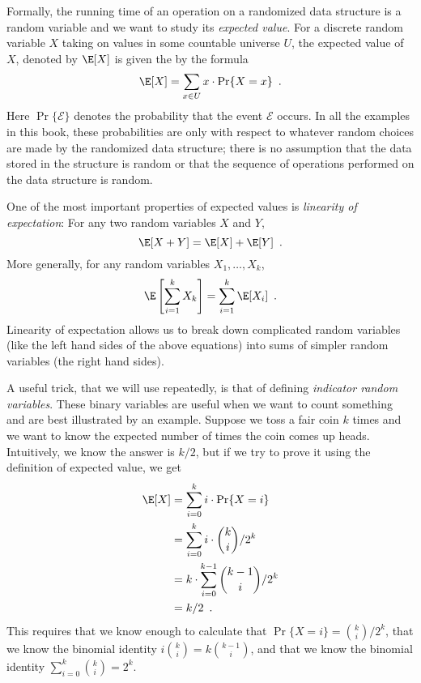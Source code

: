 Formally, the running time of an operation on a randomized data structure
is a random variable and we want to study its \emph{expected value}. For
a discrete random variable $X$ taking on values in some countable universe
$U$, the expected value of $X$, denoted by $\E[X]$ is given the by the formula
\[
    \E[X] = \sum_{x\in U} x\cdot\Pr\{X=x\} \enspace .
\]
Here $\Pr\{\mathcal{E}\}$ denotes the probability that the event
$\mathcal{E}$ occurs.  In all the examples in this book, these
probabilities are only with respect to whatever random choices are made
by the randomized data structure;  there is no assumption that the data
stored in the structure is random or that the sequence of operations
performed on the data structure is random.

One of the most important properties of expected values is \emph{linearity
of expectation}:  For any two random variables $X$ and $Y$,
\[
   \E[X+Y] = \E[X] + \E[Y] \enspace .
\]
More generally, for any random variables $X_1,\ldots,X_k$,
\[
   \E\left[\sum_{i=1}^k X_k\right] = \sum_{i=1}^k \E[X_i] \enspace .
\]
Linearity of expectation allows us to break down complicated random variables (like the left hand sides of the above equations) into sums of simpler random variables (the right hand sides).

A useful trick, that we will use repeatedly, is that of defining
\emph{indicator random variables}.  These binary variables are useful
when we want to count something and are best illustrated by an example.
Suppose we toss a fair coin $k$ times and we want to know the expected
number of times the coin comes up heads.  Intuitively, we know the answer
is $k/2$, but if we try to prove it using the definition of expected
value, we get
\begin{align*}
   \E[X] & = \sum_{i=0}^k i\cdot\Pr\{X=i\} \\
         & = \sum_{i=0}^k i\cdot\binom{k}{i}/2^k \\
         & = k\cdot \sum_{i=0}^{k-1}\binom{k-1}{i}/2^k \\
         & = k/2 \enspace .
\end{align*}
This requires that we know enough to calculate that $\Pr\{X=i\}
= \binom{k}{i}/2^k$, that we know the binomial identity
$i\binom{k}{i}=k\binom{k-1}{i}$, and that we know the binomial identity
$\sum_{i=0}^{k} \binom{k}{i} = 2^{k}$.

